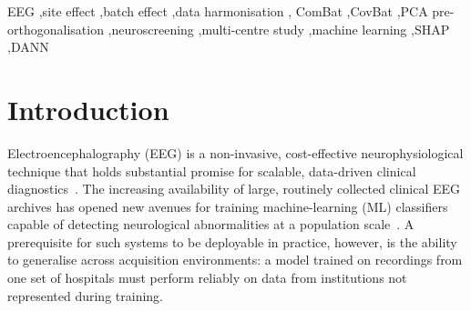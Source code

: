 \documentclass[preprint,12pt]{elsarticle}
\begin{document}
\begin{frontmatter}
\begin{abstract}
correction reorganises rather than eliminates the multivariate site
structure encoded in feature covariances.
Notably, logistic regression applied to the same harmonised features
showed \emph{reduced} site discriminability, demonstrating that the
paradox is classifier-dependent: it arises from the interaction
between residual multivariate covariance structure and nonlinear
classifier expressiveness.
A sensitivity analysis across PCA retained-variance levels (100\%,
99\%, 95\%, 90\%, 80\%) revealed that retaining 90\% of variance
yielded the best trade-off between site-invariance and clinical
utility.
PCA pre-orthogonalisation, in combination with any of the marginal
correction methods, yields more uniform cross-site neuroscreening
performance than marginal correction alone.
Despite the paradox, all harmonisation strategies produced modest but
consistent improvements in the downstream neuroscreening task under
both 5-fold cross-validation and a rigorous Leave-One-Site-Out (LOSO)
protocol.
These results indicate that the site effect constitutes a complex,
high-dimensional challenge that standard marginal correction methods
cannot fully resolve, and motivate signal-level adversarial
harmonisation as a complementary direction.
\textbf{[DANN RESULTS --- Julia to fill]}
\end{abstract}

\begin{keyword}
EEG \sep site effect \sep batch effect \sep data harmonisation \sep
ComBat \sep CovBat \sep PCA pre-orthogonalisation \sep neuroscreening
\sep multi-centre study \sep machine learning \sep SHAP \sep DANN
\end{keyword}

\end{frontmatter}

\section{Introduction}
\label{sec:introduction}

Electroencephalography (EEG) is a non-invasive, cost-effective
neurophysiological technique that holds substantial promise for
scalable, data-driven clinical diagnostics~\cite{poziomska2026quantity}.
The increasing availability of large, routinely collected clinical EEG
archives has opened new avenues for training machine-learning (ML)
classifiers capable of detecting neurological abnormalities at a
population scale~\cite{mushtaq2025eeg}.
A prerequisite for such systems to be deployable in practice, however,
is the ability to generalise across acquisition environments: a model
trained on recordings from one set of hospitals must perform reliably
on data from institutions not represented during training.
\end{document}
